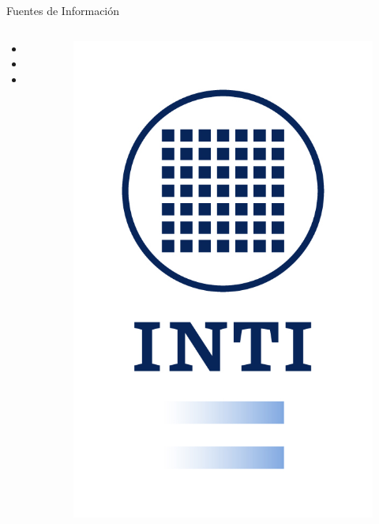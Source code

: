 \documentclass{beamer}
\begin{document}
\begin{frame}{Fuentes de Información}{}
  \begin{columns}
      \begin{itemize}
        \small
        \item
        \item
        \item
      \end{itemize}
      \begin{figure}[!t]
        \centering
        \includegraphics[width=\textwidth]{../../logosINTI/2016/01_isologotipo_institucional_fondo_blanco.jpg}
      \end{figure}
  \end{columns}
\end{frame}
\end{document}
